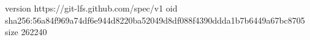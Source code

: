version https://git-lfs.github.com/spec/v1
oid sha256:56a84f969a74df6e944d8220ba52049d8df088f4390ddda1b7b6449a67bc8705
size 262240

